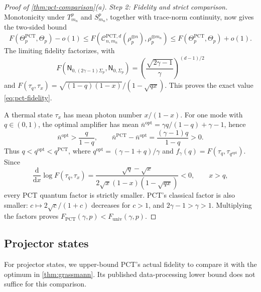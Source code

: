 \documentclass[11pt]{article}
\theoremstyle{remark}
\theoremstyle{plain}
\newcommand{\cC}{\mathcal C}
\newcommand{\dd}{\mathrm d}
\newcommand{\ot}{\otimes}
\newcommand{\Funiv}{F_{\mathrm{univ}}}
\begin{document}
\begin{proof}[Proof of \cref{thm:pct-comparison}\textup{(a)}]
\emph{Step 2: Fidelity and strict comparison.}
Monotonicity under \(T_{m_n}^p\) and \(S_{m_n}^p\), together with
trace-norm continuity, now gives the two-sided bound
\[
  F(\Theta_p^{\mathrm{PCT}},\Theta_p)-o(1)
  \le F\!\left(\cC_{n,m_n}^{\mathrm{PCT},d}(\rho_p^{\ot n}),\rho_p^{\ot m_n}\right)
  \le F(\Theta_p^{\mathrm{PCT}},\Theta_p)+o(1).
\]
The limiting fidelity factorizes, with
\begin{equation}\label{eq:pct-classical-affinity}
  F\!\left(\mathsf N_{0,(2\gamma-1)\Sigma_p},
            \mathsf N_{0,\Sigma_p}\right)
  =\left(\frac{\sqrt{2\gamma-1}}{\gamma}\right)^{(d-1)/2}
\end{equation}
and
\(F(\tau_q,\tau_x)=\sqrt{(1-q)(1-x)}/(1-\sqrt{qx})\).
This proves the exact value \eqref{eq:pct-fidelity}.

A thermal state \(\tau_x\) has mean photon number \(x/(1-x)\).
For one mode with \(q\in(0,1)\), the optimal amplifier has mean
\(\bar n^{\mathrm{opt}}=\gamma q/(1-q)+\gamma-1\), hence
\[
  \bar n^{\mathrm{opt}}>\frac q{1-q},
  \qquad
  \bar n^{\mathrm{PCT}}-\bar n^{\mathrm{opt}}
  =\frac{(\gamma-1)q}{1-q}>0.
\]
Thus \(q<q^{\mathrm{opt}}<q^{\mathrm{PCT}}\), where
\(q^{\mathrm{opt}}=(\gamma-1+q)/\gamma\) and
\(f_\gamma(q)=F(\tau_q,\tau_{q^{\mathrm{opt}}})\).  Since
\[
  \frac{\dd}{\dd x}\log F(\tau_q,\tau_x)
  =\frac{\sqrt q-\sqrt x}
         {2\sqrt x(1-x)(1-\sqrt{qx})}<0,\qquad x>q,
\]
every PCT quantum factor is strictly smaller.  PCT's classical factor
is also smaller: \(c\mapsto2\sqrt c/(1+c)\) decreases for \(c>1\),
and \(2\gamma-1>\gamma>1\).  Multiplying the factors proves
\(F_{\mathrm{PCT}}(\gamma,p)<\Funiv(\gamma,p)\).
\end{proof}

\subsection{Projector states}
\label{app:pct-projector}

For projector states, we upper-bound PCT's actual fidelity to compare it
with the optimum in \cref{thm:grassmann}. Its published data-processing
lower bound does not suffice for this comparison.
\end{document}
